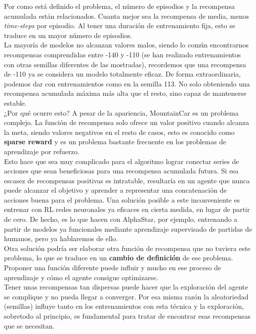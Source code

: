 \documentclass[11pt,fleqn]{book} %
\begin{document}
Por como está definido el problema, el número de episodios y la recompensa acumulada están relacionados. Cuanta mejor sea la recompensa de media, menos \textit{time-steps} por episodio. Al tener una duración de entrenamiento fija, esto se traduce en un mayor número de episodios. \\

La mayoría de modelos no alcanzan valores malos, siendo lo común encontrarnos recompensas comprendidas entre -140 y -110 (se han realizado entrenamientos con otras semillas diferentes de las mostradas), recordemos que una recompensa de -110 ya se considera un modelo totalmente eficaz. De forma extraordinaria, podemos dar con entrenamientos como en la semilla 113. No solo obteniendo una recompensa acumulada máxima más alta que el resto, sino capaz de mantenerse estable. \\

¿Por qué ocurre esto? A pesar de la apariencia, MountainCar es un problema complejo. La función de recompensa solo ofrece un valor positivo cuando alcanza la meta, siendo valores negativos en el resto de casos, esto es conocido como \textbf{sparse reward} y es un problema bastante frecuente en los problemas de aprendizaje por refuerzo. \cite{article:sparse} \\

Esto hace que sea muy complicado para el algoritmo lograr conectar series de acciones que sean beneficiosas para una recompensa acumulada futura. Si esa escasez de recompensas positivas es intratable, resultaría en un agente que nunca puede alcanzar el objetivo y aprender a representar una concatenación de acciones buena para el problema. Una solución posible a este inconveniente es entrenar con RL redes neuronales ya eficaces en cierta medida, en lugar de partir de cero. De hecho, es lo que hacen con AlphaStar, por ejemplo, entrenando a partir de modelos ya funcionales mediante aprendizaje supervisado de partidas de humanos, pero ya hablaremos de ello. \\

Otra solución podría ser elaborar otra función de recompensa que no tuviera este problema, lo que se traduce en un \textbf{cambio de definición} de ese problema. Proponer una función diferente puede influir y mucho en ese proceso de aprendizaje y cómo el agente consigue optimizarse. \\

Tener unas recompensas tan dispersas puede hacer que la exploración del agente se complique y no pueda llegar a converger. Por esa misma razón la aleatoriedad (semillas) influye tanto en los entrenamientos con esta técnica y la exploración, sobretodo al principio, es fundamental para tratar de encontrar esas recompensas que se necesitan. \\
\end{document}
